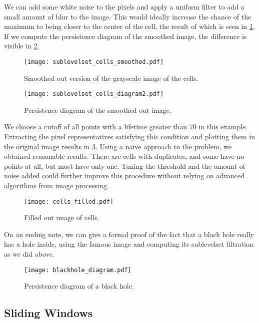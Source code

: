 We can add some white noise to the pixels and apply a uniform filter to add a small amount of blur to the image. This would ideally increase the chance of the maximum to being closer to the center of the cell, the result of which is seen in \ref{fig:cells_smoothed}. If we compute the persistence diagram of the smoothed image, the difference is visible in \ref{fig:cells_diagram2}.

\begin{figure}[h!]
  \centering
  \texttt{[image: sublevelset\_cells\_smoothed.pdf]}
  \caption{Smoothed out version of the grayscale image of the cells.}
  \label{fig:cells_smoothed}
\end{figure}

\begin{figure}[h!]
  \centering
  \texttt{[image: sublevelset\_cells\_diagram2.pdf]}
  \caption{Persistence diagram of the smoothed out image.}
  \label{fig:cells_diagram2}
\end{figure}

We choose a cutoff of all points with a lifetime greater than 70 in this example. Extracting the pixel representatives satisfying this condition and plotting them in the original image results in \ref{fig:cells_filled}. Using a naive approach to the problem, we obtained reasonable results. There are cells with duplicates, and some have no points at all, but most have only one. Tuning the threshold and the amount of noise added could further improve this procedure without relying on advanced algorithms from image processing.

\begin{figure}[h!]
  \centering
  \texttt{[image: cells\_filled.pdf]}
  \caption{Filled out image of cells.}
  \label{fig:cells_filled}
\end{figure}

On an ending note, we can give a formal proof of the fact that a black hole really has a hole inside, using the famous image and computing its sublevelset filtration as we did above.

\begin{figure}[h!]
  \centering
  \texttt{[image: blackhole\_diagram.pdf]}
  \caption{Persistence diagram of a black hole.}
  \label{fig:black_hole}
\end{figure}

\subsection{Sliding Windows}


